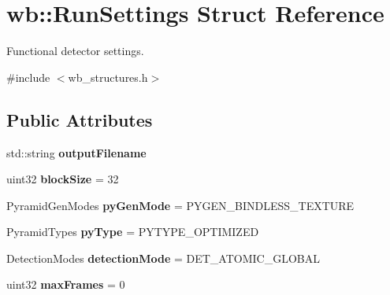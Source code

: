 \hypertarget{structwb_1_1_run_settings}{}\section{wb\+:\+:Run\+Settings Struct Reference}
\label{structwb_1_1_run_settings}


Functional detector settings.  




{\ttfamily \#include $<$wb\+\_\+structures.\+h$>$}

\subsection*{Public Attributes}
\begin{DoxyCompactItemize}
\item 
\hypertarget{structwb_1_1_run_settings_a6a3a2de13aebeac46542a790a0853e58}{}std\+::string {\bfseries output\+Filename}\label{structwb_1_1_run_settings_a6a3a2de13aebeac46542a790a0853e58}

\item 
\hypertarget{structwb_1_1_run_settings_aab8c5e58a1ab10f0d429bde53f504cc7}{}uint32 {\bfseries block\+Size} = 32\label{structwb_1_1_run_settings_aab8c5e58a1ab10f0d429bde53f504cc7}

\item 
\hypertarget{structwb_1_1_run_settings_ac29a30523547343f7239a4394de91092}{}Pyramid\+Gen\+Modes {\bfseries py\+Gen\+Mode} = P\+Y\+G\+E\+N\+\_\+\+B\+I\+N\+D\+L\+E\+S\+S\+\_\+\+T\+E\+X\+T\+U\+R\+E\label{structwb_1_1_run_settings_ac29a30523547343f7239a4394de91092}

\item 
\hypertarget{structwb_1_1_run_settings_acb1261a3407f4e2aebf69984fb22ab12}{}Pyramid\+Types {\bfseries py\+Type} = P\+Y\+T\+Y\+P\+E\+\_\+\+O\+P\+T\+I\+M\+I\+Z\+E\+D\label{structwb_1_1_run_settings_acb1261a3407f4e2aebf69984fb22ab12}

\item 
\hypertarget{structwb_1_1_run_settings_ab5ba96488066e94557948e20ac26ec08}{}Detection\+Modes {\bfseries detection\+Mode} = D\+E\+T\+\_\+\+A\+T\+O\+M\+I\+C\+\_\+\+G\+L\+O\+B\+A\+L\label{structwb_1_1_run_settings_ab5ba96488066e94557948e20ac26ec08}

\item 
\hypertarget{structwb_1_1_run_settings_adbde0d8a113d6db565e6bb9cbcdaeefb}{}uint32 {\bfseries max\+Frames} = 0\label{structwb_1_1_run_settings_adbde0d8a113d6db565e6bb9cbcdaeefb}

\end{DoxyCompactItemize}


